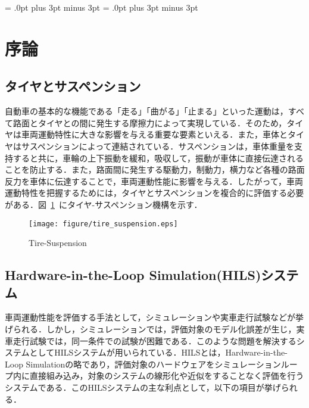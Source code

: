 \documentclass[a4paper,12pt]{article_vdlab_sotsuron}
\begin{document}
\kanjiskip = .0pt plus 3pt minus 3pt
\xkanjiskip = .0pt plus 3pt minus 3pt
\small
{}

\begin{center}
\end{center}

\tableofcontents

\newpage
\section{序論}
\subsection{タイヤとサスペンション}
自動車の基本的な機能である「走る」「曲がる」「止まる」といった運動は，すべて路面とタイヤとの間に発生する摩擦力によって実現している．そのため，タイヤは車両運動特性に大きな影響を与える重要な要素といえる．また，車体とタイヤはサスペンションによって連結されている．サスペンションは，車体重量を支持すると共に，車輪の上下振動を緩和，吸収して，振動が車体に直接伝達されることを防止する．また，路面間に発生する駆動力，制動力，横力など各種の路面反力を車体に伝達することで，車両運動性能に影響を与える．したがって，車両運動特性を把握するためには，タイヤとサスペンションを複合的に評価する必要がある．図~\ref{fig:tire_suspention}~にタイヤ-サスペンション機構を示す．

\vspace*{10mm}
\begin{figure}[h]
  \begin{center}
    \texttt{[image: figure/tire\_suspension.eps]}
    \vspace*{3mm}
    \caption{Tire-Suspension\cite{1}}
    \label{fig:tire_suspention}
  \end{center}
\end{figure}

\newpage
\subsection{Hardware-in-the-Loop Simulation(HILS)システム}
車両運動性能を評価する手法として，シミュレーションや実車走行試験などが挙げられる．しかし，シミュレーションでは，評価対象のモデル化誤差が生じ，実車走行試験では，同一条件での試験が困難である．このような問題を解決するシステムとしてHILSシステムが用いられている\cite{2}．HILSとは，Hardware-in-the-Loop Simulationの略であり，評価対象のハードウェアをシミュレーションループ内に直接組み込み，対象のシステムの線形化や近似をすることなく評価を行うシステムである．このHILSシステムの主な利点として，以下の項目が挙げられる．
\end{document}
